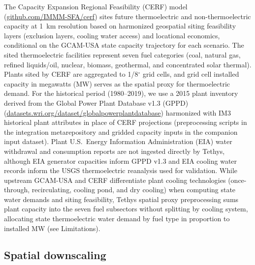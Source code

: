 \documentclass[fleqn,10pt]{wlscirep}
\begin{document}
The Capacity Expansion Regional Feasibility (CERF) model\cite{Vernon2021,Vernon2023GRIDCERF,Mongird2025CERF} (\href{https://github.com/IMMM-SFA/cerf}{github.com/IMMM-SFA/cerf}) sites future thermoelectric and non-thermoelectric capacity at 1~km resolution based on harmonized geospatial siting feasibility layers\cite{Vernon2023GRIDCERF} (exclusion layers, cooling water access) and locational economics, conditional on the GCAM-USA state capacity trajectory for each scenario. The sited thermoelectric facilities represent seven fuel categories (coal, natural gas, refined liquids/oil, nuclear, biomass, geothermal, and concentrated solar thermal). Plants sited by CERF are aggregated to 1/8$^{\circ}$ grid cells, and grid cell installed capacity in megawatts (MW) serves as the spatial proxy for thermoelectric demand. For the historical period (1980--2019), we use a 2015 plant inventory derived from the Global Power Plant Database v1.3 (GPPD)\cite{globalpowerplantdb} (\href{https://datasets.wri.org/dataset/globalpowerplantdatabase}{datasets.wri.org/dataset/globalpowerplantdatabase}) harmonized with IM3 historical plant attributes in place of CERF projections (preprocessing scripts in the integration metarepository\cite{cambrackenIMMMSFATethys_integration_metarepoV1012026} and gridded capacity inputs in the companion input dataset\cite{brackenDataTethys_integration_metarepo}). Plant U.S.\ Energy Information Administration (EIA) water withdrawal and consumption reports are not ingested directly by Tethys, although EIA generator capacities inform GPPD v1.3 and EIA cooling water records inform the USGS thermoelectric reanalysis\cite{Galanter2023USGS,Harris2025,skinnerWaterWithdrawalConsumption2025} used for validation. While upstream GCAM-USA\cite{Binsted_2022} and CERF\cite{Mongird2025CERF} differentiate plant cooling technologies (once-through, recirculating, cooling pond, and dry cooling) when computing state water demands and siting feasibility, Tethys spatial proxy preprocessing sums plant capacity into the seven fuel subsectors without splitting by cooling system, allocating state thermoelectric water demand by fuel type in proportion to installed MW\cite{Peer2016ERL,Sjostedt2025EST} (see Limitations).

\subsection*{Spatial downscaling}
\end{document}
